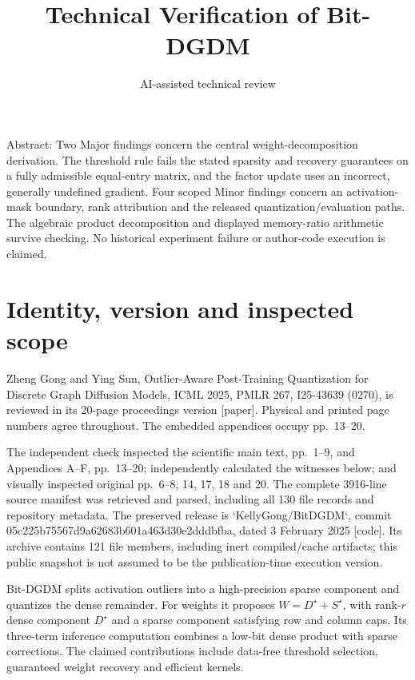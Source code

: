 \documentclass[10pt]{article}
\title{Technical Verification of Bit-DGDM}
\author{AI-assisted technical review}
\date{}
\begin{document}
\maketitle
Abstract: Two Major findings concern the central weight-decomposition derivation. The threshold rule fails the stated sparsity and recovery guarantees on a fully admissible equal-entry matrix, and the factor update uses an incorrect, generally undefined gradient. Four scoped Minor findings concern an activation-mask boundary, rank attribution and the released quantization/evaluation paths. The algebraic product decomposition and displayed memory-ratio arithmetic survive checking. No historical experiment failure or author-code execution is claimed.\par
\section*{Identity, version and inspected scope}
Zheng Gong and Ying Sun, Outlier-Aware Post-Training Quantization for Discrete Graph Diffusion Models, ICML 2025, PMLR 267, I25-43639 (0270), is reviewed in its 20-page proceedings version [paper]. Physical and printed page numbers agree throughout. The embedded appendices occupy pp. 13–20.\par
The independent check inspected the scientific main text, pp. 1–9, and Appendices A–F, pp. 13–20; independently calculated the witnesses below; and visually inspected original pp. 6–8, 14, 17, 18 and 20. The complete 3916-line source manifest was retrieved and parsed, including all 130 file records and repository metadata. The preserved release is `KellyGong/BitDGDM`, commit 05c225b75567d9a62683b601a463d30e2dddbfba, dated 3 February 2025 [code]. Its archive contains 121 file members, including inert compiled/cache artifacts; this public snapshot is not assumed to be the publication-time execution version.\par
Bit-DGDM splits activation outliers into a high-precision sparse component and quantizes the dense remainder. For weights it proposes \(W=D^\star+S^\star\), with rank-\(r\) dense component \(D^\star\) and a sparse component satisfying row and column caps. Its three-term inference computation combines a low-bit dense product with sparse corrections. The claimed contributions include data-free threshold selection, guaranteed weight recovery and efficient kernels.\par
\end{document}
